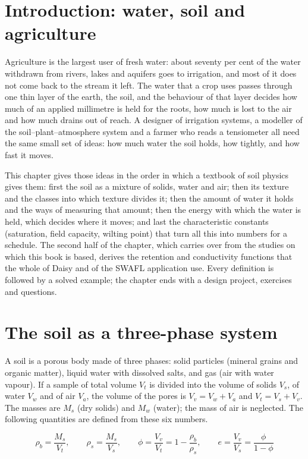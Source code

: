 \section{Introduction: water, soil and agriculture}
Agriculture is the largest user of fresh water: about seventy per cent of the water withdrawn from rivers, lakes and aquifers goes to irrigation, and most of it does not come back to the stream it left. The water that a crop uses passes through one thin layer of the earth, the soil, and the behaviour of that layer decides how much of an applied millimetre is held for the roots, how much is lost to the air and how much drains out of reach. A designer of irrigation systems, a modeller of the soil--plant--atmosphere system and a farmer who reads a tensiometer all need the same small set of ideas: how much water the soil holds, how tightly, and how fast it moves.

This chapter gives those ideas in the order in which a textbook of soil physics gives them: first the soil as a mixture of solids, water and air; then its texture and the classes into which texture divides it; then the amount of water it holds and the ways of measuring that amount; then the energy with which the water is held, which decides where it moves; and last the characteristic constants (saturation, field capacity, wilting point) that turn all this into numbers for a schedule. The second half of the chapter, which carries over from the studies on which this book is based, derives the retention and conductivity functions that the whole of Daisy and of the SWAFL application use. Every definition is followed by a solved example; the chapter ends with a design project, exercises and questions.

\section{The soil as a three-phase system}
A soil is a porous body made of three phases: solid particles (mineral grains and organic matter), liquid water with dissolved salts, and gas (air with water vapour). If a sample of total volume $V_t$ is divided into the volume of solids $V_s$, of water $V_w$ and of air $V_a$, the volume of the pores is $V_v=V_w+V_a$ and $V_t=V_s+V_v$. The masses are $M_s$ (dry solids) and $M_w$ (water); the mass of air is neglected. The following quantities are defined from these six numbers.

\begin{equation}\rho_b=\frac{M_s}{V_t},\qquad \rho_s=\frac{M_s}{V_s},\qquad \phi=\frac{V_v}{V_t}=1-\frac{\rho_b}{\rho_s},\qquad e=\frac{V_v}{V_s}=\frac{\phi}{1-\phi}\label{eq:phase}\end{equation}


